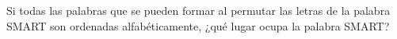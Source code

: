 Si todas las palabras que se pueden formar al permutar las letras de la palabra SMART son ordenadas alfabéticamente, ¿qué lugar ocupa la palabra SMART?